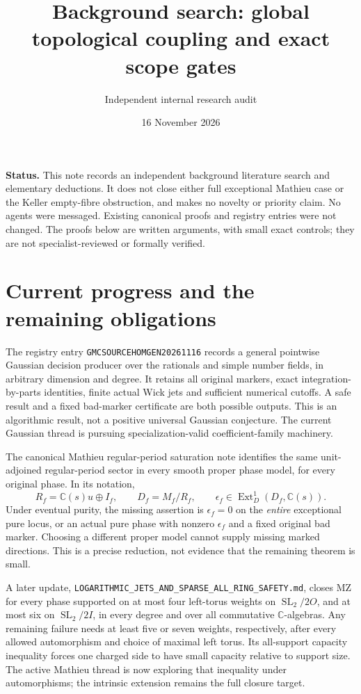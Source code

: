\documentclass[11pt]{article}
\title{Background search: global topological coupling and exact scope gates}
\author{Independent internal research audit}
\date{16 November 2026}
\newcommand{\C}{\mathbb C}
\newcommand{\SL}{\operatorname{SL}}
\begin{document}
\maketitle

\noindent\textbf{Status.}
This note records an independent background literature search and elementary
deductions. It does not close either full exceptional Mathieu case or the
Keller empty-fibre obstruction, and makes no novelty or priority claim.
No agents were messaged. Existing canonical proofs and registry entries were
not changed. The proofs below are written arguments, with small exact controls;
they are not specialist-reviewed or formally verified.

\section{Current progress and the remaining obligations}

The registry entry \texttt{GMCSOURCEHOMGEN20261116} records a general pointwise
Gaussian decision producer over the rationals and simple number fields, in
arbitrary dimension and degree. It retains all original markers, exact
integration-by-parts identities, finite actual Wick jets and sufficient
numerical cutoffs. A safe result and a fixed bad-marker certificate are both
possible outputs. This is an algorithmic result, not a positive universal
Gaussian conjecture. The current Gaussian thread is pursuing
specialization-valid coefficient-family machinery.

The canonical Mathieu regular-period saturation note
identifies the same unit-adjoined regular-period sector in every smooth proper
phase model, for every original phase. In its notation,
\[
 R_f=\C(s)u\oplus I_f,\qquad
 D_f=M_f/R_f,\qquad
 \epsilon_f\in\operatorname{Ext}^1_D(D_f,\C(s)).
\]
Under eventual purity, the missing assertion is $\epsilon_f=0$ on the
\emph{entire} exceptional pure locus, or an actual pure phase with nonzero
$\epsilon_f$ and a fixed original bad marker. Choosing a different proper
model cannot supply missing marked directions. This is a precise reduction,
not evidence that the remaining theorem is small.

A later update, \texttt{LOGARITHMIC\_JETS\_AND\_SPARSE\_ALL\_RING\_SAFETY.md},
closes MZ for every phase supported on at most four left-torus weights
on $\SL_2/2O$, and at most six on $\SL_2/2I$, in every degree and over
all commutative $\C$-algebras. Any remaining failure needs at least five
or seven weights, respectively, after every allowed automorphism and
choice of maximal left torus. Its all-support capacity inequality forces
one charged side to have small capacity relative to support size.
The active Mathieu thread is now exploring that inequality under
automorphisms; the intrinsic extension remains the full closure target.
\end{document}
